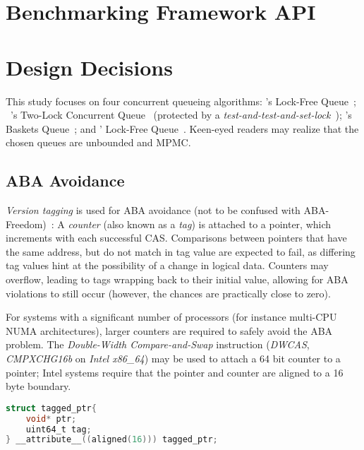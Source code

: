\section{Benchmarking Framework API}

\section{Design Decisions}
This study focuses on four concurrent queueing algorithms:
\citeauthor{michael1996simple}'s Lock-Free Queue~\citep{michael1996simple};
~\citeauthor{michael1996simple}'s Two-Lock Concurrent
Queue~\citep{michael1996simple} (protected by a \emph{test-and-test-and-set-lock}~\citep{mellor1991algorithms}); \citeauthor{hoffman2007baskets}'s Baskets
Queue~\citep{hoffman2007baskets}; and \citeauthor{valois1994queues}' Lock-Free
Queue~\citep{valois1994queues}. Keen-eyed readers may realize that the chosen
queues are unbounded and MPMC.

\subsection{ABA Avoidance}

\emph{Version tagging} is used for ABA avoidance (not to be confused with
ABA-Freedom)~\citep{dechev2010understanding}:
A \emph{counter} (also known as a \emph{tag}) is attached to a pointer, which increments with
each successful CAS. Comparisons between pointers that have the same address,
but do not match in tag value are expected to fail, as differing tag values hint
at the possibility of a change in logical data. Counters may overflow, leading to tags wrapping back
to their initial value, allowing for ABA violations to still occur (however,
the chances are practically close to zero).

For systems with a significant number of processors (for instance multi-CPU NUMA
architectures), larger counters are required  to safely avoid the ABA problem.
The \emph{Double-Width Compare-and-Swap} instruction (\emph{DWCAS}, \emph{CMPXCHG16b} on
\emph{Intel x86\_64}) may be used to attach a 64 bit counter to a pointer; Intel
systems require that the pointer and counter are aligned to a 16 byte boundary.

\begin{lstlisting}[language=C,caption={Struct aligned to 16 bytes, as required by the DWCAS instruction.}]
struct tagged_ptr{
    void* ptr;
    uint64_t tag;
} __attribute__((aligned(16))) tagged_ptr;
\end{lstlisting}

